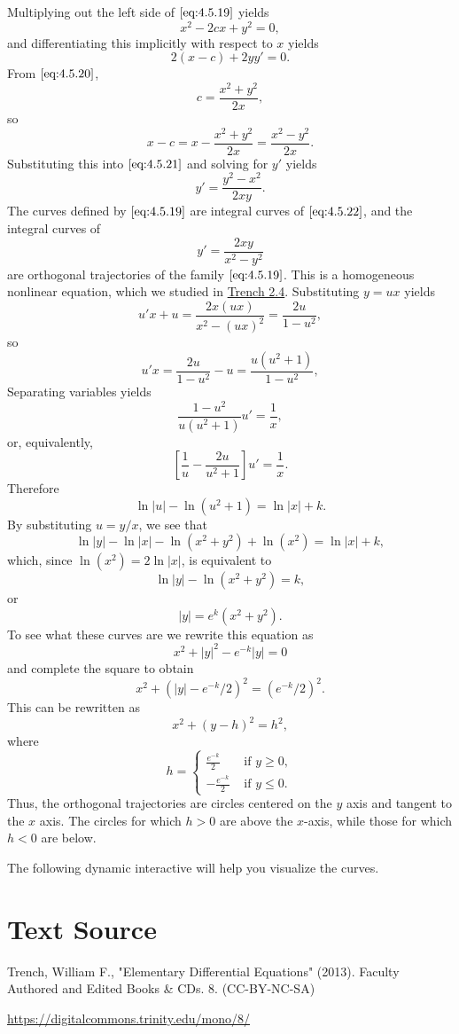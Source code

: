 \documentclass{ximera}
\begin{document}
\begin{example}
\begin{explanation}
Multiplying out the left side of $\eqref{eq:4.5.19}$ yields
\begin{equation} \label{eq:4.5.20}
x^2-2cx+y^2=0,
\end{equation}
and differentiating this implicitly with respect to $x$ yields
\begin{equation} \label{eq:4.5.21}
2(x-c)+2yy'=0.
\end{equation}
 From $\eqref{eq:4.5.20}$,
$$
c=\frac{x^2+y^2}{2x},
$$
so
$$
x-c=x-\frac{x^2+y^2}{2x}=\frac{x^2-y^2}{2x}.
$$
Substituting this into $\eqref{eq:4.5.21}$ and solving for $y'$ yields
\begin{equation} \label{eq:4.5.22}
y'=\frac{y^2-x^2}{2xy}.
\end{equation}
The curves defined by $\eqref{eq:4.5.19}$ are integral curves of
$\eqref{eq:4.5.22}$, and the integral curves of
$$
y'=\frac{2xy}{x^2-y^2}
$$
are orthogonal trajectories of the family $\eqref{eq:4.5.19}$. This is a
homogeneous nonlinear equation, which we studied in
\href{https://ximera.osu.edu/ode/main/nonlinearToSeparable/nonlinearToSeparable}{Trench 2.4}. Substituting $y=ux$ yields
$$
u'x+u=\frac{2x(ux)}{x^2-(ux)^2}=\frac{2u}{1-u^2},
$$
so
$$
u'x=\frac{2u}{1-u^2}-u=\frac{u(u^2+1)}{1-u^2},
$$
Separating variables yields
$$
\frac{1-u^2}{u(u^2+1)}u'=\frac{1}{x},
$$
or, equivalently,
$$
\left[\frac{1}{u}-\frac{2u}{u^2+1}\right]u'=\frac{1}{x}.
$$
Therefore
$$
\ln |u|-\ln (u^2+1)=\ln |x|+k.
$$
By substituting $u=y/x$, we see that
$$
\ln|y|-\ln|x|-\ln(x^2+y^2)+\ln(x^2)=\ln|x|+k,
$$
which, since $\ln(x^2)=2\ln|x|$, is equivalent to
$$
\ln|y|-\ln(x^2+y^2)=k,
$$
or
$$
|y|=e^k(x^2+y^2).
$$
To see what these curves are we rewrite this equation as
$$
x^2+|y|^2-e^{-k}|y|=0
$$
and complete the square to obtain
$$
x^2+(|y|-e^{-k}/2)^2=(e^{-k}/2)^2.
$$
This can be rewritten as
$$
x^2+(y-h)^2=h^2,
$$
where
$$
h=\left\{\begin{array}{rl} \frac{e^{-k}}{2}&\mbox{ if } y\geq
0,\\-\frac{e^{-k}}{2}&\mbox{ if } y\leq 0. \end{array}\right.
$$
Thus, the orthogonal trajectories are circles centered on the $y$ axis
and tangent to the $x$ axis. The circles
for which $h>0$ are above the $x$-axis, while those for which $h<0$
are below.


 

The following dynamic interactive will help you visualize the curves.

\begin{center}  
\end{center}

 
\end{explanation}
\end{example}
 
 
\section*{Text Source}
Trench, William F., "Elementary Differential Equations" (2013). Faculty Authored and Edited Books \& CDs. 8. (CC-BY-NC-SA)
 
\href{https://digitalcommons.trinity.edu/mono/8/}{https://digitalcommons.trinity.edu/mono/8/}
 
 
\end{document}
